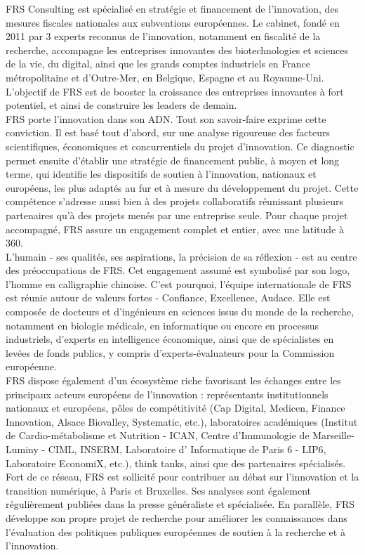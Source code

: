 FRS Consulting est spécialisé en stratégie et financement de l'innovation, des mesures fiscales nationales aux subventions européennes. Le cabinet, fondé en 2011 par 3 experts reconnus de l'innovation, notamment en fiscalité de la recherche, accompagne les entreprises innovantes des biotechnologies et sciences de la vie, du digital, ainsi que les grands comptes industriels en France métropolitaine et d'Outre-Mer, en Belgique, Espagne et au Royaume-Uni. L'objectif de FRS est de booster la croissance des entreprises innovantes à fort potentiel, et ainsi de construire les leaders de demain.\\

FRS porte l'innovation dans son ADN. Tout son savoir-faire exprime cette conviction. Il est basé tout d'abord, sur une analyse rigoureuse des facteurs scientifiques, économiques et concurrentiels du projet d'innovation. Ce diagnostic permet ensuite d'établir une stratégie de financement public, à moyen et long terme, qui identifie les dispositifs de soutien à l'innovation, nationaux et européens, les plus adaptés au fur et à mesure du développement du projet. Cette compétence s'adresse aussi bien à des projets collaboratifs réunissant plusieurs partenaires qu'à des projets menés par une entreprise seule. Pour chaque projet accompagné, FRS assure un engagement complet et entier, avec une latitude à 360\degree.\\

L'humain - ses qualités, ses aspirations, la précision de sa réflexion - est au centre des préoccupations de FRS. Cet engagement assumé est symbolisé par son logo, l'homme en calligraphie chinoise. C'est pourquoi, l'équipe internationale de FRS est réunie autour de valeurs fortes - Confiance, Excellence, Audace. Elle est composée de docteurs et d'ingénieurs en sciences issus du monde de la recherche, notamment en biologie médicale, en informatique ou encore en processus industriels, d'experts en intelligence économique, ainsi que de spécialistes en levées de fonds publics, y compris d'experts-évaluateurs pour la Commission européenne.\\

FRS dispose également d'un écosystème riche favorisant les échanges entre les principaux acteurs européens de l'innovation : représentants institutionnels nationaux et européens, pôles de compétitivité (Cap Digital, Medicen, Finance Innovation, Alsace Biovalley, Systematic, etc.), laboratoires académiques (Institut de Cardio-métabolisme et Nutrition - ICAN, Centre d'Immunologie de Marseille- Luminy - CIML, INSERM, Laboratoire d' Informatique de Paris 6 - LIP6, Laboratoire EconomiX, etc.), think tanks, ainsi que des partenaires spécialisés. Fort de ce réseau, FRS est sollicité pour contribuer au débat sur l'innovation et la transition numérique, à Paris et Bruxelles. Ses analyses sont également régulièrement publiées dans la presse généraliste et spécialisée.
En parallèle, FRS développe son propre projet de recherche pour améliorer les connaissances dans l'évaluation des politiques publiques européennes de soutien à la recherche et à l'innovation.\\

